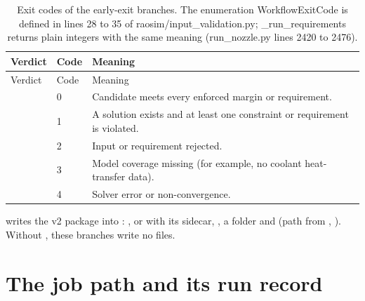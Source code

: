 {\small
\begin{longtable}{P{3.6cm}P{1.0cm}P{10.8cm}}
\caption{Exit codes of the early-exit branches. The enumeration WorkflowExitCode is defined in lines 28 to 35 of raosim/input\_validation.py; \_run\_requirements returns plain integers with the same meaning (run\_nozzle.py lines 2420 to 2476).}\label{tab:df-exit}\\
\toprule
Verdict & Code & Meaning \\
\midrule
\endfirsthead
\toprule
Verdict & Code & Meaning \\
\midrule
\endhead
{} & 0 & Candidate meets every enforced margin or requirement. \\
 & 1 & A solution exists and at least one constraint or requirement is violated. \\
 & 2 & Input or requirement rejected. \\
 & 3 & Model coverage missing (for example, no coolant heat-transfer data). \\
 & 4 & Solver error or non-convergence. \\
\bottomrule
\end{longtable}}

 writes the v2 package into : ,  or  with its  sidecar, , a  folder and  (path from , ). Without , these branches write no files.

\section{The job path and its run record}\label{sec:df-job}

